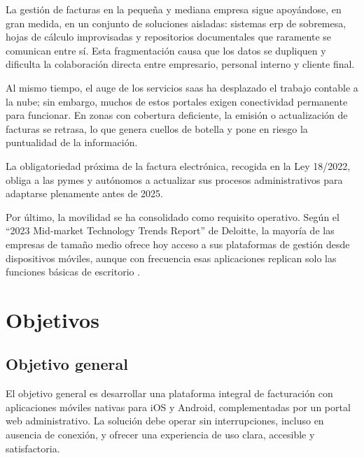 \begin{large}

La gestión de facturas en la pequeña y mediana empresa sigue apoyándose, en gran medida, en un conjunto de soluciones aisladas: sistemas \gls{erp} de sobremesa, hojas de cálculo improvisadas y repositorios documentales que raramente se comunican entre sí. Esta fragmentación causa que los datos se dupliquen y dificulta la colaboración directa entre empresario, personal interno y cliente final.

Al mismo tiempo, el auge de los servicios \gls{saas} ha desplazado el trabajo contable a la nube; sin embargo, muchos de estos portales exigen conectividad permanente para funcionar. En zonas con cobertura deficiente, la emisión o actualización de facturas se retrasa, lo que genera cuellos de botella y pone en riesgo la puntualidad de la información.

La obligatoriedad próxima de la factura electrónica, recogida en la Ley 18/2022, obliga a las pymes y autónomos a actualizar sus procesos administrativos para adaptarse plenamente antes de 2025.

Por último, la movilidad se ha consolidado como requisito operativo. Según el \enquote{2023 Mid‐market Technology Trends Report} de Deloitte, la mayoría de las empresas de tamaño medio ofrece hoy acceso a sus plataformas de gestión desde dispositivos móviles, aunque con frecuencia esas aplicaciones replican solo las funciones básicas de escritorio \cite{estudio_movilidad}.

\end{large}

\section{Objetivos}

\subsection{Objetivo general}

\begin{large}

El objetivo general es desarrollar una plataforma integral de facturación con aplicaciones móviles nativas para iOS y Android, complementadas por un portal web administrativo. La solución debe operar sin interrupciones, incluso en ausencia de conexión, y ofrecer una experiencia de uso clara, accesible y satisfactoria.

\end{large}

